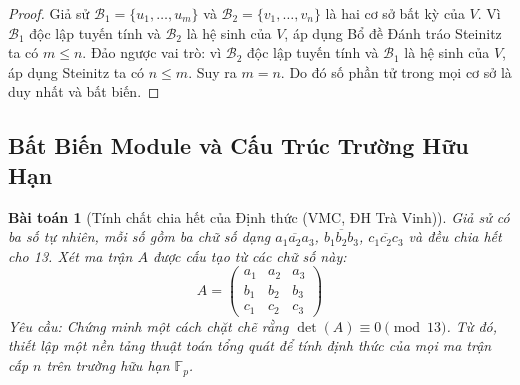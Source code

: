 \documentclass{article}
\newtheorem{baitoan}{Bài toán}
\begin{document}
\begin{proof}
Giả sử $\mathcal{B}_1 = \{u_1, \dots, u_m\}$ và $\mathcal{B}_2 = \{v_1, \dots, v_n\}$ là hai cơ sở bất kỳ của $V$.
Vì $\mathcal{B}_1$ độc lập tuyến tính và $\mathcal{B}_2$ là hệ sinh của $V$, áp dụng Bổ đề Đánh tráo Steinitz ta có $m \le n$.
Đảo ngược vai trò: vì $\mathcal{B}_2$ độc lập tuyến tính và $\mathcal{B}_1$ là hệ sinh của $V$, áp dụng Steinitz ta có $n \le m$.
Suy ra $m = n$. Do đó số phần tử trong mọi cơ sở là duy nhất và bất biến.
\end{proof}

\subsection{Bất Biến Module và Cấu Trúc Trường Hữu Hạn}

\begin{baitoan}[Tính chất chia hết của Định thức (VMC, ĐH Trà Vinh)]
Giả sử có ba số tự nhiên, mỗi số gồm ba chữ số dạng $\overline{a_1a_2a_3}$, $\overline{b_1b_2b_3}$, $\overline{c_1c_2c_3}$ và đều chia hết cho 13. Xét ma trận $A$ được cấu tạo từ các chữ số này:
\begin{equation*}
 A = \begin{pmatrix}
 a_1 & a_2 & a_3\\b_1 & b_2 & b_3\\c_1 & c_2 & c_3
 \end{pmatrix}
\end{equation*}
Yêu cầu: Chứng minh một cách chặt chẽ rằng $\det(A) \equiv 0 \pmod{13}$. Từ đó, thiết lập một nền tảng thuật toán tổng quát để tính định thức của mọi ma trận cấp $n$ trên trường hữu hạn $\mathbb{F}_p$.
\end{baitoan}
\end{document}
